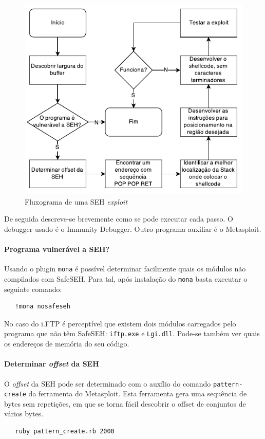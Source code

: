 \documentclass[11pt,a4paper]{article}
\begin{document}
\begin{figure}[h]
        \centering
        \includegraphics[width=0.7\linewidth]{fc1}
        \caption{Fluxograma de uma SEH \textit{exploit}}
        \label{fig:flowchart1}
\end{figure}
De seguida descreve-se brevemente como se pode executar cada passo. O debugger usado é o Immunity Debugger. Outro programa auxiliar é o Metasploit.

\paragraph*{Programa vulnerável a SEH?} Usando o plugin \texttt{mona} é possível determinar facilmente quais os módulos não compilados com SafeSEH. Para tal, após instalação do \texttt{mona} basta executar o seguinte comando:
\begin{lstlisting}
   !mona nosafeseh
\end{lstlisting}
No caso do i.FTP é perceptível que existem dois módulos carregados pelo programa que não têm SafeSEH: \texttt{iftp.exe} e \texttt{Lgi.dll}. Pode-se também ver quais os endereços de memória do seu código.

\paragraph*{Determinar \textit{offset} da SEH} O \textit{offset} da SEH pode ser determinado com o auxílio do comando \texttt{pattern-create} da ferramenta do Metasploit. Esta ferramenta gera uma sequência de bytes sem repetições, em que se torna fácil descobrir o offset de conjuntos de vários bytes.

\begin{lstlisting}
   ruby pattern_create.rb 2000
\end{lstlisting}
\end{document}
